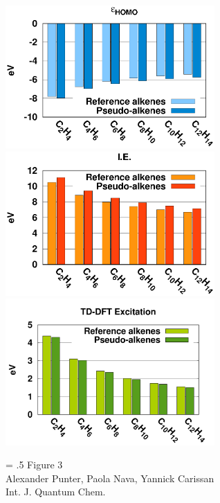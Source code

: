 \documentclass[12pt]{article}
\begin{document}
\clearpage

\begin{figure}
\begin{center}
\includegraphics[width=8cm]{short_pbe0_homo_uhf}\\
\includegraphics[width=8cm]{short_pbe0_ie_uhf}\\
\includegraphics[width=8cm]{short_pbe0_tddft}
\end{center}
{\Large
\begin{minipage}[t]{3in}
\baselineskip = .5\baselineskip
Figure 3 \\
Alexander Punter, Paola Nava, Yannick Carissan\\
Int. J. Quantum Chem.
\end{minipage}
}
\end{figure}

\clearpage
\end{document}
